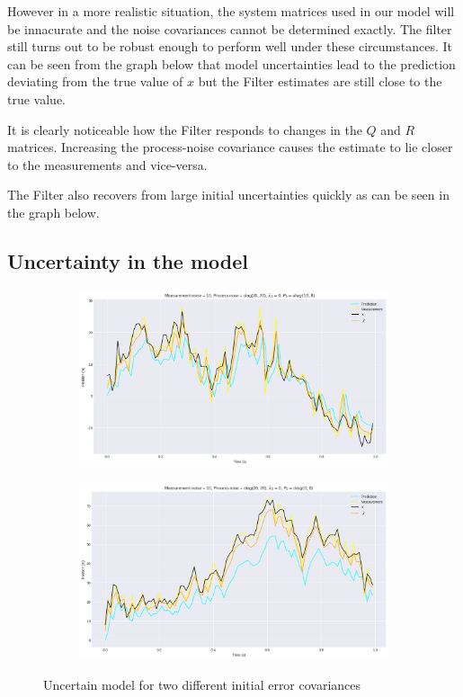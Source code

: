 \documentclass[11pt]{article}
\begin{document}
However 
in a more realistic situation, the system matrices used in our model will be innacurate and the noise covariances cannot be determined exactly.
The filter still turns out to be robust enough to perform well under these circumstances. It can be seen from the graph 
below that model uncertainties lead to the prediction deviating from the true value of $x$ but the Filter estimates are still close to 
the true value.

It is clearly noticeable how the Filter
responds to changes in the $Q$ and $R$ matrices. Increasing the process-noise covariance causes 
the estimate to lie closer to the measurements and vice-versa. 

The Filter also recovers from large 
initial uncertainties quickly as can be seen in the graph below.
\subsection*{Uncertainty in the model}
\begin{figure}[H]
    \centering
    \begin{subfigure}[H]{0.49\linewidth}
        \includegraphics[width=\linewidth]{../kfmodeluncer1.png}
    \end{subfigure}
    \begin{subfigure}[H]{0.49\linewidth}
        \includegraphics[width=\linewidth]{../kfmodeluncer2.png}
    \end{subfigure}
    \caption*{Uncertain model for two different initial error covariances}
\end{figure}
\end{document}
